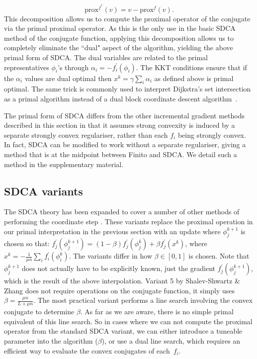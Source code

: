 \documentclass{article}
\newcommand{\stepsize}{\gamma} %
\begin{document}
\[
\text{prox}^{f^{*}}(v)=v-\text{prox}^{f}(v).
\]
This decomposition allows us to compute the proximal operator of the conjugate via the primal proximal operator. As this is the only use in the basic SDCA method of the conjugate function, applying this decomposition allows us to completely eliminate the ``dual" aspect of the algorithm, yielding the above primal form of SDCA. The dual variables are related to the primal representatives $\phi_i$'s through $\alpha_i = -f^\prime_i(\phi_i)$. The KKT conditions ensure that if the $\alpha_i$ values are dual optimal then $x^k =  \stepsize \sum_i \alpha_i$ as defined above is primal optimal. The same trick is commonly used to interpret Dijkstra's set intersection as a primal algorithm instead of a dual block coordinate descent algorithm~\citep{prox-dk}.

The primal form of SDCA differs from the other incremental gradient methods described in this section in that it assumes strong convexity is induced by a separate strongly convex regulariser, rather than each $f_i$ being strongly convex. In fact, SDCA can be modified to work without a separate regulariser, giving a method that is at the midpoint between Finito and SDCA. We detail such a method in the supplementary material.

\subsection*{SDCA variants}
\label{subset:other-sdca}
The SDCA theory has been expanded to cover a number of other methods of performing the coordinate step \citep{sdca-accel}.  These variants replace the proximal operation in our primal interpretation in the previous section with an update where $\phi_{j}^{k+1}$ is chosen so that:
$
 	 f_{j}^{\prime} (\phi_{j}^{k+1})  = (1-\beta) f_{j}^{\prime} (\phi_{j}^{k}) + \beta f_{j}^{\prime} (x^{k})
$, 
where $x^{k}=-\frac{1}{\mu n}\sum_{i}f_{i}^{\prime}(\phi_{i}^{k})$. The variants differ in how $\beta \in [0,1]$  
is chosen. Note that $\phi_{j}^{k+1}$ does not actually have to be explicitly known, just the gradient $f_{j}^{\prime} (\phi_{j}^{k+1})$, which is the result of the above interpolation. Variant 5 by Shalev-Shwartz \& Zhang \citep{sdca-accel} does not require operations on the conjugate function, it simply uses $\beta = \frac{\mu n}{L+\mu n}$. The most practical variant performs a line search involving the convex conjugate to determine $\beta$. As far as we are aware, there is no simple primal equivalent of this line search. So in cases where we can not compute the proximal operator from the standard SDCA variant, we can either introduce a tuneable parameter into the algorithm ($\beta$), or use a dual line search, which requires an efficient way to evaluate the convex conjugates of each~$f_i$.
\end{document}
